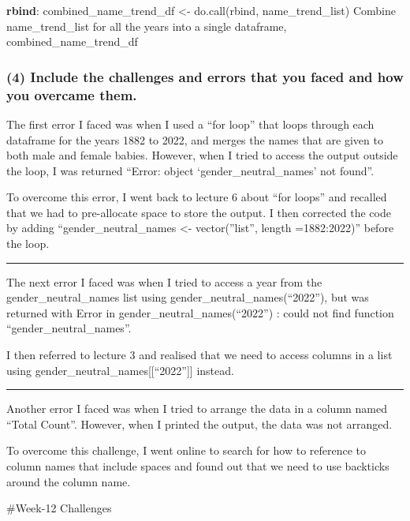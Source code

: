 \documentclass[
]{article}
\begin{document}
\textbf{rbind}: combined\_name\_trend\_df \textless- do.call(rbind,
name\_trend\_list) Combine name\_trend\_list for all the years into a
single dataframe, combined\_name\_trend\_df

\hypertarget{include-the-challenges-and-errors-that-you-faced-and-how-you-overcame-them.}{%
\subsubsection{(4) Include the challenges and errors that you faced and
how you overcame
them.}\label{include-the-challenges-and-errors-that-you-faced-and-how-you-overcame-them.}}

The first error I faced was when I used a ``for loop'' that loops
through each dataframe for the years 1882 to 2022, and merges the names
that are given to both male and female babies. However, when I tried to
access the output outside the loop, I was returned ``Error: object
`gender\_neutral\_names' not found''.

To overcome this error, I went back to lecture 6 about ``for loops'' and
recalled that we had to pre-allocate space to store the output. I then
corrected the code by adding ``gender\_neutral\_names \textless-
vector(''list'', length =1882:2022)'' before the loop.

\begin{center}\rule{0.5\linewidth}{0.5pt}\end{center}

The next error I faced was when I tried to access a year from the
gender\_neutral\_names list using gender\_neutral\_names(``2022''), but
was returned with Error in gender\_neutral\_names(``2022'') : could not
find function ``gender\_neutral\_names''.

I then referred to lecture 3 and realised that we need to access columns
in a list using gender\_neutral\_names{[}{[}``2022''{]}{]} instead.

\begin{center}\rule{0.5\linewidth}{0.5pt}\end{center}

Another error I faced was when I tried to arrange the data in a column
named ``Total Count''. However, when I printed the output, the data was
not arranged.

To overcome this challenge, I went online to search for how to reference
to column names that include spaces and found out that we need to use
backticks around the column name.

\#Week-12 Challenges
\end{document}
